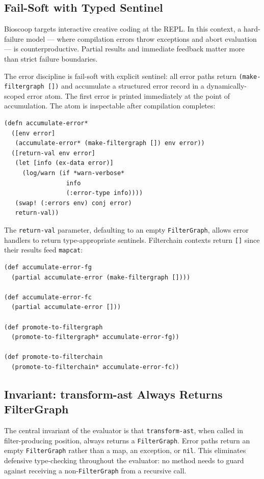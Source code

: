 \documentclass[conference]{IEEEtran}
\begin{document}
\subsection{Fail-Soft with Typed Sentinel}

Bioscoop targets interactive creative coding at the REPL. In this context, a hard-failure model --- where compilation errors throw exceptions and abort evaluation --- is counterproductive. Partial results and immediate feedback matter more than strict failure boundaries.

The error discipline is fail-soft with explicit sentinel: all error paths return \texttt{(make-filtergraph [])} and accumulate a structured error record in a dynamically-scoped error atom. The first error is printed immediately at the point of accumulation. The atom is inspectable after compilation completes:

\begin{lstlisting}[caption={Error accumulation}]
(defn accumulate-error*
  ([env error]
   (accumulate-error* (make-filtergraph []) env error))
  ([return-val env error]
   (let [info (ex-data error)]
     (log/warn (if *warn-verbose*
                 info
                 (:error-type info))))
   (swap! (:errors env) conj error)
   return-val))
\end{lstlisting}

The \texttt{return-val} parameter, defaulting to an empty \texttt{FilterGraph}, allows error handlers to return type-appropriate sentinels. Filterchain contexts return \texttt{[]} since their results feed \texttt{mapcat}:

\begin{lstlisting}[caption={Partial application for context-appropriate sentinels}]
(def accumulate-error-fg
  (partial accumulate-error (make-filtergraph [])))

(def accumulate-error-fc
  (partial accumulate-error []))

(def promote-to-filtergraph
  (promote-to-filtergraph* accumulate-error-fg))

(def promote-to-filterchain
  (promote-to-filterchain* accumulate-error-fc))
\end{lstlisting}

\subsection{Invariant: transform-ast Always Returns FilterGraph}

The central invariant of the evaluator is that \texttt{transform-ast}, when called in filter-producing position, always returns a \texttt{FilterGraph}. Error paths return an empty \texttt{FilterGraph} rather than a map, an exception, or \texttt{nil}. This eliminates defensive type-checking throughout the evaluator: no method needs to guard against receiving a non-\texttt{FilterGraph} from a recursive call.
\end{document}
